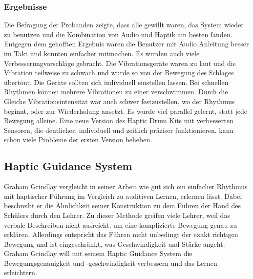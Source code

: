 \documentclass[ngerman,runningheads,a4paper]{llncs}
\begin{document}
\subsubsection{Ergebnisse}
Die Befragung der Probanden zeigte, dass alle gewillt waren, das System wieder zu benutzen und die Kombination von Audio und Haptik am besten fanden.
Entgegen dem gehofften Ergebnis waren die Benutzer mit Audio Anleitung besser im Takt und konnten einfacher mitmachen.
Es wurden auch viele Verbesserungvorschläge gebracht.
Die Vibrationsgeräte waren zu laut und die Vibration teilweise zu schwach und wurde so von der Bewegung des Schlages übertönt.
Die Geräte sollten sich individuell einstellen lassen.
Bei schnellen Rhythmen können mehrere Vibrationen zu einer verschwimmen.
Durch die Gleiche Vibrationsintensität war auch schwer festzustellen, wo der Rhythmus beginnt, oder zur Wiederholung ansetzt.
Es wurde viel parallel gelernt, statt jede Bewegung alleine.
Eine neue Version des Haptic Drum Kits mit verbesserten Sensoren, die deutlicher, individuell und zeitlich präziser funktionieren, kann schon viele Probleme der ersten Version beheben.


\subsection{Haptic Guidance System}
Graham Grindlay \cite{4479984} vergleicht in seiner Arbeit wie gut sich ein einfacher Rhythmus mit haptischer Führung im Vergleich zu auditiven Lernen, erlernen lässt.
Dabei beschreibt er die Ähnlichkeit seiner Konstruktion zu dem Führen der Hand des Schülers durch den Lehrer.
Zu dieser Methode greifen viele Lehrer, weil das verbale Beschreiben nicht ausreicht, um eine komplizierte Bewegung genau zu erklären.
Allerdings entspricht das Führen nicht unbedingt der exakt richtigen Bewegung und ist eingeschränkt, was Geschwindigkeit und Stärke angeht.
Graham Grindlay will mit seinem Haptic Guidance System die Bewegungsgenauigkeit und -geschwindigkeit verbessern und das Lernen erleichtern.
\end{document}
